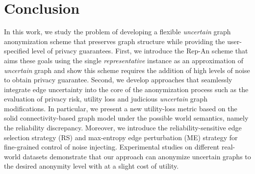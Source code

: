 \section{Conclusion}
In this work, we study the problem of developing a flexible \emph{uncertain} graph anonymization scheme that preserves graph structure while providing the user-specified level of privacy guarantees. First, we introduce the Rep-An scheme that aims these goals using the single \emph{representative} instance as an approximation of \emph{uncertain} graph and show this scheme requires the addition of high levels of noise to obtain privacy guarantee. 
Second, we develop {\SysNameNS} approaches that seamlessly integrate edge uncertainty into the core of the
anonymization process such as the evaluation of privacy risk, utility loss and judicious \emph{uncertain} graph modifications. 
In particular, we present a new utility-loss metric based on the solid connectivity-based graph model under the possible world semantics, namely the reliability discrepancy. Moreover, we introduce the reliability-sensitive edge selection strategy (RS) and max-entropy edge perturbation (ME) strategy for fine-grained control of noise injecting. 
Experimental studies on different real-world datasets demonstrate that our approach can anonymize uncertain graphs to the desired anonymity level with at a slight cost of utility. 